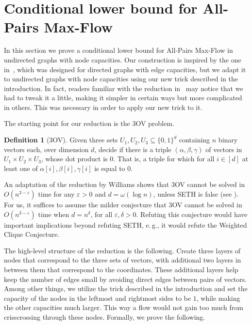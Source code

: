 \documentclass[11pt]{article}
\numberwithin{equation}{section}
\theoremstyle{definition}
\newtheorem{definition}[theorem]{Definition}
\theoremstyle{plain}
\newcommand{\eg}{e.\,g.}
\theoremstyle{plain}
\newcommand{\ProblemName}[1]{\textsf{#1}}
\newcommand{\SETH}{SETH\xspace}
\newcommand{\APMF}{\ProblemName{All-Pairs Max-Flow}\xspace}
\newcommand{\TOV}{\ProblemName{$3$OV}\xspace}
\newcommand\eps{\varepsilon}
\begin{document}
\section{Conditional lower bound for \APMF}\label{sec:lower}

In this section we prove a conditional lower bound for \APMF
in undirected graphs with node capacities.
Our construction is inspired by the one in~\cite{KT18}, which was designed for directed graphs with edge capacities, but we
%
adapt it to undirected graphs with node capacities %
%
using our new trick described in the introduction.
In fact, readers familiar with the reduction in~\cite{KT18} may notice that we had to tweak it a little, making it simpler in certain ways but more complicated in others.  This was necessary in order to apply our new trick
%
%
to it.

The starting point for our reduction is the \TOV problem.
\begin{definition}[\TOV]
Given three sets $U_1, U_2, U_3 \subseteq \{0,1\}^d$ containing $n$ binary vectors each, over dimension $d$, decide if there is a triple $(\alpha,\beta,\gamma)$ of vectors in $U_1 \times U_2 \times U_3$, whose dot product is $0$. That is, a triple for which for all $i \in [d]$ at least one of $\alpha[i],\beta[i],\gamma[i]$ is equal to $0$.
\end{definition}

An adaptation of the reduction by Williams \cite{Wil05} shows that  \TOV cannot be solved in $O(n^{3-\eps})$ time for any $\eps>0$ and $d=\omega(\log{n})$, unless \SETH is false (see \cite{ABV15}).
For us, it suffices to assume the milder conjecture that \TOV cannot be solved in  $O(n^{3-\eps})$ time when $d=n^{\delta}$, for all $\eps,\delta>0$.
Refuting this conjecture
%
would have    %
important implications beyond refuting \SETH \cite{GIKW17,ABDN18}, \eg, it
%
would refute  %
the Weighted Clique Conjecture.

The %
high-level   %
structure of the reduction is the
%
%
following.  Create  %
three layers of nodes that correspond to the three sets of vectors, with additional two layers in between them that correspond to the coordinates. These additional layers help keep the number of edges small by avoiding direct edges between pairs of vectors.
Among other things, we utilize the trick described in the introduction and set the capacity of the nodes in the leftmost and rightmost sides to be $1$, while making the other capacities much larger. This way a flow would not gain too much from crisscrossing through these nodes. Formally, we prove the following.
\end{document}
